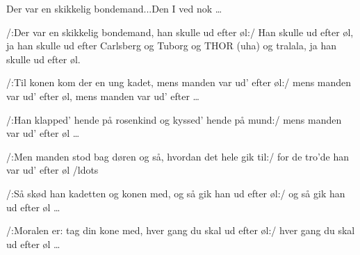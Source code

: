 \begin{sang}{Der var en skikkelig bondemand...}{Den I ved nok \ldots}
\begin{vers}
/:Der var en skikkelig bondemand,
han skulle ud efter øl:/
Han skulle ud efter øl,
ja han skulle ud efter Carlsberg og
Tuborg og THOR (uha) og tralala, 
ja han skulle ud efter øl.
\end{vers} 
\begin{vers}
/:Til konen kom der en ung kadet,
mens manden var ud' efter øl:/
mens manden var ud' efter øl, 
mens manden var ud' efter \ldots 
\end{vers} 
\begin{vers}
/:Han klapped' hende på rosenkind
og kyssed' hende på mund:/ 
mens manden var ud' efter øl \ldots 
\end{vers}
\vbox{}\vfill 
\begin{vers}
/:Men manden stod bag døren og så,
hvordan det hele gik til:/ 
for de tro'de han var ud' efter øl /ldots 
\end{vers} 
\begin{vers}
/:Så skød han kadetten og konen med,
og så gik han ud efter øl:/ 
og så gik han ud efter øl \ldots
\end{vers} 
\begin{vers}
/:Moralen er: tag din kone med,
hver gang du skal ud efter øl:/  
hver gang du skal ud efter øl \ldots  
\end{vers}
\laps
\end{sang}